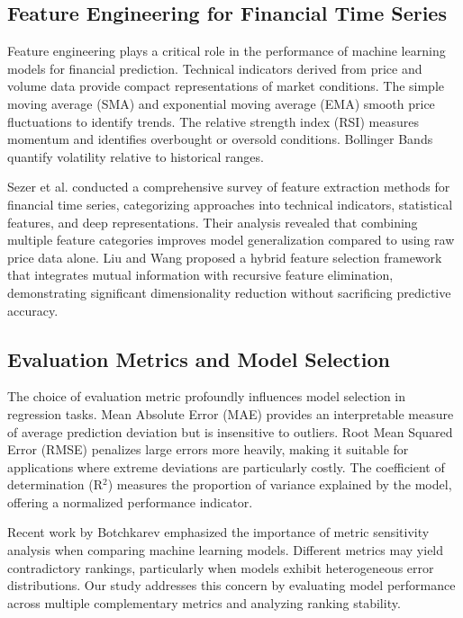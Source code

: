 \documentclass[conference]{IEEEtran}
\begin{document}
\subsection{Feature Engineering for Financial Time Series}

Feature engineering plays a critical role in the performance of machine learning models for financial prediction.
Technical indicators derived from price and volume data provide compact representations of market conditions.
The simple moving average (SMA) and exponential moving average (EMA) smooth price fluctuations to identify trends.
The relative strength index (RSI) measures momentum and identifies overbought or oversold conditions.
Bollinger Bands quantify volatility relative to historical ranges.

Sezer et al. conducted a comprehensive survey of feature extraction methods for financial time series, categorizing approaches into technical indicators, statistical features, and deep representations.
Their analysis revealed that combining multiple feature categories improves model generalization compared to using raw price data alone.
Liu and Wang proposed a hybrid feature selection framework that integrates mutual information with recursive feature elimination, demonstrating significant dimensionality reduction without sacrificing predictive accuracy.

\subsection{Evaluation Metrics and Model Selection}

The choice of evaluation metric profoundly influences model selection in regression tasks.
Mean Absolute Error (MAE) provides an interpretable measure of average prediction deviation but is insensitive to outliers.
Root Mean Squared Error (RMSE) penalizes large errors more heavily, making it suitable for applications where extreme deviations are particularly costly.
The coefficient of determination (R$^2$) measures the proportion of variance explained by the model, offering a normalized performance indicator.

Recent work by Botchkarev emphasized the importance of metric sensitivity analysis when comparing machine learning models.
Different metrics may yield contradictory rankings, particularly when models exhibit heterogeneous error distributions.
Our study addresses this concern by evaluating model performance across multiple complementary metrics and analyzing ranking stability.
\end{document}
